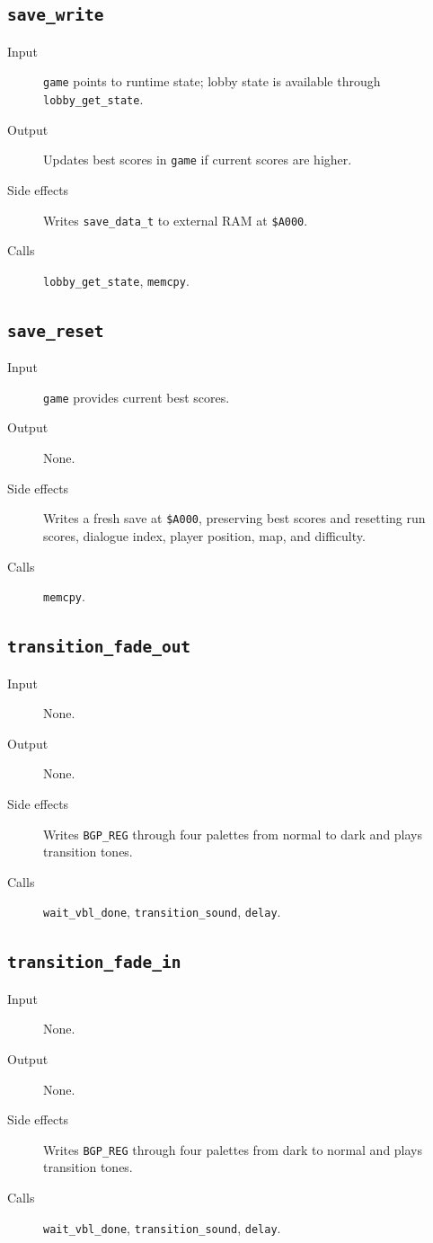 \subsection*{\texttt{save\_write}}
\begin{description}
  \item[Input] \texttt{game} points to runtime state; lobby state is available through \texttt{lobby\_get\_state}.
  \item[Output] Updates best scores in \texttt{game} if current scores are higher.
  \item[Side effects] Writes \texttt{save\_data\_t} to external RAM at \texttt{\$A000}.
  \item[Calls] \texttt{lobby\_get\_state}, \texttt{memcpy}.
\end{description}

\subsection*{\texttt{save\_reset}}
\begin{description}
  \item[Input] \texttt{game} provides current best scores.
  \item[Output] None.
  \item[Side effects] Writes a fresh save at \texttt{\$A000}, preserving best scores and resetting run scores, dialogue index, player position, map, and difficulty.
  \item[Calls] \texttt{memcpy}.
\end{description}

\subsection*{\texttt{transition\_fade\_out}}
\begin{description}
  \item[Input] None.
  \item[Output] None.
  \item[Side effects] Writes \texttt{BGP\_REG} through four palettes from normal to dark and plays transition tones.
  \item[Calls] \texttt{wait\_vbl\_done}, \texttt{transition\_sound}, \texttt{delay}.
\end{description}

\subsection*{\texttt{transition\_fade\_in}}
\begin{description}
  \item[Input] None.
  \item[Output] None.
  \item[Side effects] Writes \texttt{BGP\_REG} through four palettes from dark to normal and plays transition tones.
  \item[Calls] \texttt{wait\_vbl\_done}, \texttt{transition\_sound}, \texttt{delay}.
\end{description}

